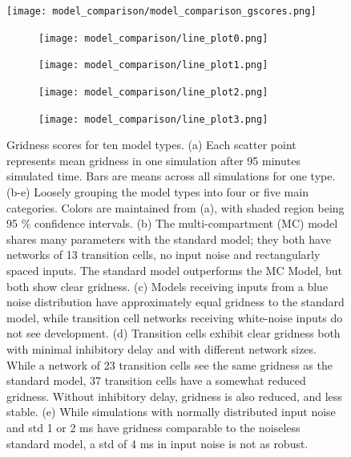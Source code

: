 \documentclass{article}
\begin{document}
    \begin{figure}[H]
        \centering  
        \begin{minipage}[b]{1\textwidth}
            \centering
            \subcaption{}
            \texttt{[image: model\_comparison/model\_comparison\_gscores.png]}
        \end{minipage}
        \begin{minipage}[t]{1\textwidth}
            \begin{subfigure}{0.5\textwidth}
                \subcaption{}
                \texttt{[image: model\_comparison/line\_plot0.png]}
            \end{subfigure}
            \begin{subfigure}{0.5\textwidth}
                \subcaption{}
                \texttt{[image: model\_comparison/line\_plot1.png]}
            \end{subfigure}
            \begin{subfigure}{0.5\textwidth}
                \subcaption{}
                \texttt{[image: model\_comparison/line\_plot2.png]}
            \end{subfigure}
            \begin{subfigure}{0.5\textwidth}
                \subcaption{}
                \texttt{[image: model\_comparison/line\_plot3.png]}
            \end{subfigure}
        \end{minipage}
        \caption{Gridness scores for ten model types. (a) Each scatter point represents mean gridness in one simulation after 95 minutes simulated time. Bars are means across all simulations for one type. (b-e) Loosely grouping the model types into four or five main categories. Colors are maintained from (a), with shaded region being 95 \% confidence intervals. (b) The multi-compartment (MC) model shares many parameters with the standard model; they both have networks of 13 transition cells, no input noise and rectangularly spaced inputs. The standard model outperforms the MC Model, but both show clear gridness. (c) Models receiving inputs from a blue noise distribution have approximately equal gridness to the standard model, while transition cell networks receiving white-noise inputs do not see development. (d) Transition cells exhibit clear gridness both with minimal inhibitory delay and with different network sizes. While a network of 23 transition cells see the same gridness as the standard model, 37 transition cells have a somewhat reduced gridness. Without inhibitory delay, gridness is also reduced, and less stable. (e) While simulations with normally distributed input noise and std 1 or 2 ms have gridness comparable to the noiseless standard model, a std of 4 ms in input noise is not as robust.}
        \label{gridness_plots}
    \end{figure}
    
\end{document}
